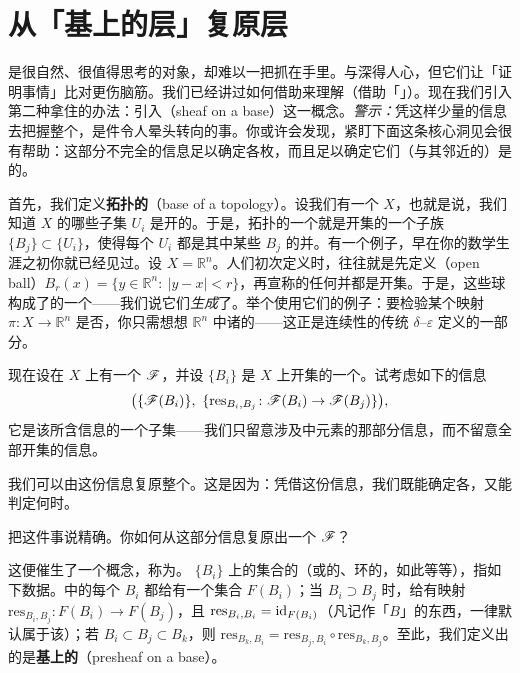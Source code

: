 
\section{从「基上的层」复原层}

\trSheaf{}是很自然、很值得思考的对象，却难以一把抓在手里。\trIdentityAxiom{}与\trGluingAxiom{}深得人心，但它们让「证明事情」比对\trPresheaf{}更伤脑筋。我们已经讲过如何借助\trStalk{}来理解\trSheaf（借助「\trCompatibleGerm」）。现在我们引入第二种拿住\trSheaf{}的办法：引入\emph{\trSheafOnBase}（sheaf on a base）这一概念。\emph{警示：}凭这样少量的信息去把握整个\trSheaf，是件令人晕头转向的事。你或许会发现，紧盯下面这条核心洞见会很有帮助：这部分不完全的信息足以确定各枚\trGerm，而且足以确定它们（与其邻近的\trGerm）是\trCompatible{}的。

首先，我们定义\textbf{拓扑的\trBase}（base of a topology）。设我们有一个\trTopologicalSpace{} $X$，也就是说，我们知道 $X$ 的哪些子集 $U_i$ 是开的。于是，拓扑的一个\trBase{}就是开集的一个子族 $\{B_j\}\subset\{U_i\}$，使得每个 $U_i$ 都是其中某些 $B_j$ 的并。有一个例子，早在你的数学生涯之初你就已经见过。设 $X=\mathbb{R}^n$。人们初次定义\trClassicalTopology{}时，往往就是先定义\emph{\trOpenBall}（open ball）$B_r(x)=\{y\in\mathbb{R}^n:\ |y-x|<r\}$，再宣称\trOpenBall{}的任何并都是开集。于是，这些球构成了\trClassicalTopology{}的一个\trBase——我们说它们\emph{生成}了\trClassicalTopology{}。举个使用它们的例子：要检验某个映射 $\pi\colon X\to\mathbb{R}^n$ 是否\trContinuous，你只需想想 $\mathbb{R}^n$ 中诸\trOpenBall{}的\trPullback——这正是连续性的传统 $\delta$--$\varepsilon$ 定义的一部分。

现在设在\trTopologicalSpace{} $X$ 上有一个\trSheaf{} $\mathscr{F}$，并设 $\{B_i\}$ 是 $X$ 上开集的一个\trBase。试考虑如下的信息
\[
\bigl(\{\scr{F}(B_i)\},\ \{\mathrm{res}_{B_i,B_j}\colon\scr{F}(B_i)\to\scr{F}(B_j)\}\bigr),
\]
它是该\trSheaf{}所含信息的一个子集——我们只留意涉及\trBase{}中元素的那部分信息，而不留意全部开集的信息。

我们可以由这份信息复原整个\trSheaf。这是因为：凭借这份信息，我们既能确定各\trStalk，又能判定\trGerm{}何时\trCompatible。

\begin{exercise}[重要练习]\label{ex:sheaf-recovered-from-base}
把这件事说精确。你如何从这部分信息复原出一个\trSheaf{} $\mathscr{F}$？
\end{exercise}

这便催生了一个概念，称为\textbf{\trSheafOnBase}。\trBase{} $\{B_i\}$ 上的集合的\trSheaf（或\trAbelianGroups{}的\trSheaf、环的\trSheaf，如此等等），指如下数据。\trBase{}中的每个 $B_i$ 都给有一个集合 $F(B_i)$；当 $B_i\supset B_j$ 时，给有映射 $\mathrm{res}_{B_i,B_j}\colon F(B_i)\to F(B_j)$，且 $\mathrm{res}_{B_i,B_i}=\mathrm{id}_{F(B_i)}$（凡记作「$B$」的东西，一律默认属于该\trBase）；若 $B_i\subset B_j\subset B_k$，则 $\mathrm{res}_{B_k,B_i}=\mathrm{res}_{B_j,B_i}\circ\mathrm{res}_{B_k,B_j}$。至此，我们定义出的是\textbf{基上的\trPresheaf}（presheaf on a base）。

